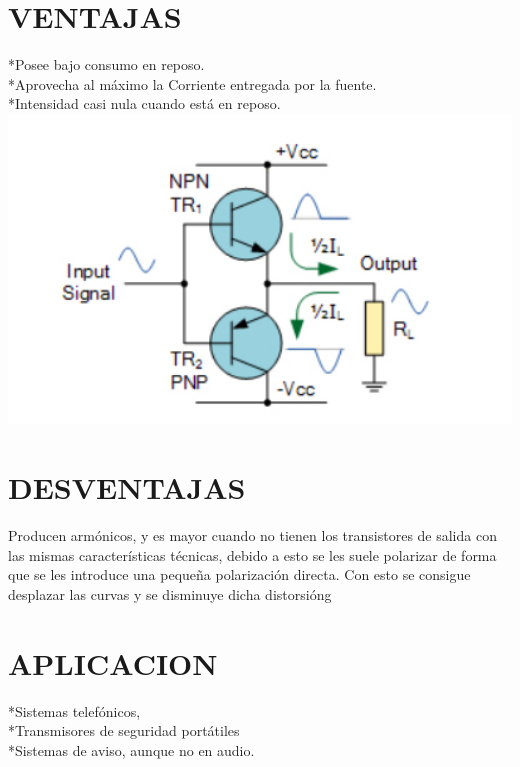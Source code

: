 \documentclass[12pt,a4paper]{article}
\begin{document}
\section{VENTAJAS}
*Posee bajo consumo en reposo.\\
*Aprovecha al m\'aximo la Corriente entregada por la fuente.\\
*Intensidad casi nula cuando est\'a en reposo.
\\
\includegraphics[width=18cm]{Amplificador clase AB.jpg} 
\section{DESVENTAJAS}
Producen arm\'onicos, y es mayor cuando no tienen los transistores de salida con las mismas caracter\'isticas t\'ecnicas, debido a esto se les suele polarizar de forma que se les introduce una peque\~na polarizaci\'on directa. Con esto se consigue desplazar las curvas y se disminuye dicha distorsi\'ong
\\
\section{APLICACION}
*Sistemas telef\'onicos,\\
*Transmisores de seguridad port\'atiles\\
*Sistemas de aviso, aunque no en audio.
\newpage
\end{document}
